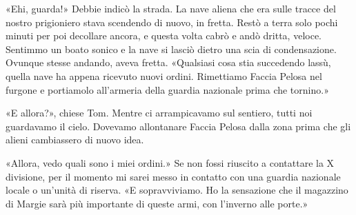 «Ehi, guarda!» Debbie indicò la strada. La nave aliena che era sulle
tracce del nostro prigioniero stava scendendo di nuovo, in fretta. Restò
a terra solo pochi minuti per poi decollare ancora, e questa volta cabrò
e andò dritta, veloce. Sentimmo un boato sonico e la nave si lasciò
dietro una scia di condensazione. Ovunque stesse andando, aveva fretta.
«Qualsiasi cosa stia succedendo lassù, quella nave ha appena ricevuto
nuovi ordini. Rimettiamo Faccia Pelosa nel furgone e portiamolo
all'armeria della guardia nazionale prima che tornino.»

«E allora?», chiese Tom. Mentre ci arrampicavamo sul sentiero, tutti noi
guardavamo il cielo. Dovevamo allontanare Faccia Pelosa dalla zona prima
che gli alieni cambiassero di nuovo idea.

«Allora, vedo quali sono i miei ordini.» Se non fossi riuscito a
contattare la X divisione, per il momento mi sarei messo in contatto con
una guardia nazionale locale o un'unità di riserva. «E sopravviviamo. Ho
la sensazione che il magazzino di Margie sarà più importante di queste
armi, con l'inverno alle porte.»